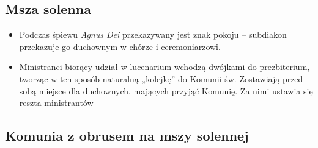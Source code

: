 		\clearpage
		
		\subsection{Msza solenna}
			
			\begin{itemize}
				\item Podczas śpiewu \textit{Agnus Dei} przekazywany jest znak pokoju – subdiakon przekazuje go duchownym w chórze i ceremoniarzowi.
				\item Ministranci biorący udział w lucenarium wchodzą dwójkami do prezbiterium, tworząc w ten sposób naturalną „kolejkę” do Komunii św. Zostawiają przed sobą miejsce dla duchownych, mających przyjąć Komunię. Za nimi ustawia się reszta ministrantów
			\end{itemize}
		
		\subsection{Komunia z obrusem na mszy solennej}
			
